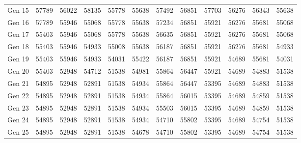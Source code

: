 \documentclass[12pt]{article}
\begin{document}
\begin{table}[h]
\begin{adjustbox}{max width=0.7\textwidth}
\begin{tabular}{*{12}{c}}
            Gen 15 & 57789 & 56022 & 58135 & 55778 & 55638 & 57492 & 56851 & 57703 & 56276 & 56343 & 55638 \\
            Gen 16 & 57789 & 55946 & 55068 & 55778 & 55638 & 57234 & 56851 & 55921 & 56276 & 55681 & 55068 \\
            Gen 17 & 55403 & 55946 & 55068 & 55778 & 55638 & 56635 & 56851 & 55921 & 56276 & 55681 & 55068 \\
            Gen 18 & 55403 & 55946 & 54933 & 55008 & 55638 & 56187 & 56851 & 55921 & 56276 & 55681 & 54933 \\
            Gen 19 & 55403 & 55946 & 54933 & 54031 & 55422 & 56187 & 56851 & 55921 & 54689 & 55681 & 54031 \\
            Gen 20 & 55403 & 52948 & 54712 & 51538 & 54981 & 55864 & 56447 & 55921 & 54689 & 54883 & 51538 \\
            Gen 21 & 54895 & 52948 & 52891 & 51538 & 54934 & 55864 & 56447 & 53395 & 54689 & 54883 & 51538 \\
            Gen 22 & 54895 & 52948 & 52891 & 51538 & 54934 & 55864 & 56015 & 53395 & 54689 & 54859 & 51538 \\
            Gen 23 & 54895 & 52948 & 52891 & 51538 & 54934 & 55503 & 56015 & 53395 & 54689 & 54859 & 51538 \\
            Gen 24 & 54895 & 52948 & 52891 & 51538 & 54934 & 54710 & 55802 & 53395 & 54689 & 54754 & 51538 \\
            Gen 25 & 54895 & 52948 & 52891 & 51538 & 54678 & 54710 & 55802 & 53395 & 54689 & 54754 & 51538 \\
            \bottomrule
        \end{tabular}
    \end{adjustbox}
\end{table}
\end{document}
